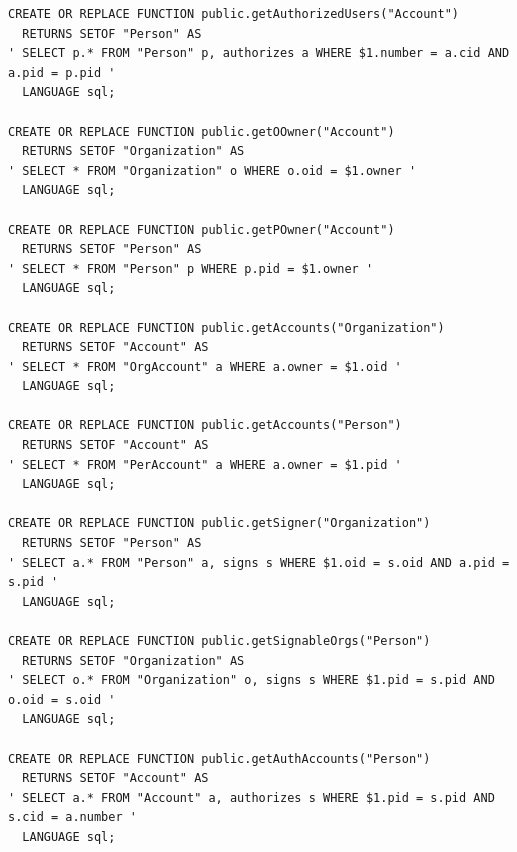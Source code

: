 \documentclass[11pt]{article}
\begin{document}
\begin{verbatim}
CREATE OR REPLACE FUNCTION public.getAuthorizedUsers("Account")
  RETURNS SETOF "Person" AS
' SELECT p.* FROM "Person" p, authorizes a WHERE $1.number = a.cid AND a.pid = p.pid '
  LANGUAGE sql;

CREATE OR REPLACE FUNCTION public.getOOwner("Account")
  RETURNS SETOF "Organization" AS
' SELECT * FROM "Organization" o WHERE o.oid = $1.owner '
  LANGUAGE sql;

CREATE OR REPLACE FUNCTION public.getPOwner("Account")
  RETURNS SETOF "Person" AS
' SELECT * FROM "Person" p WHERE p.pid = $1.owner '
  LANGUAGE sql;

CREATE OR REPLACE FUNCTION public.getAccounts("Organization")
  RETURNS SETOF "Account" AS
' SELECT * FROM "OrgAccount" a WHERE a.owner = $1.oid '
  LANGUAGE sql;

CREATE OR REPLACE FUNCTION public.getAccounts("Person")
  RETURNS SETOF "Account" AS
' SELECT * FROM "PerAccount" a WHERE a.owner = $1.pid '
  LANGUAGE sql;

CREATE OR REPLACE FUNCTION public.getSigner("Organization")
  RETURNS SETOF "Person" AS
' SELECT a.* FROM "Person" a, signs s WHERE $1.oid = s.oid AND a.pid = s.pid '
  LANGUAGE sql;

CREATE OR REPLACE FUNCTION public.getSignableOrgs("Person")
  RETURNS SETOF "Organization" AS
' SELECT o.* FROM "Organization" o, signs s WHERE $1.pid = s.pid AND o.oid = s.oid '
  LANGUAGE sql;

CREATE OR REPLACE FUNCTION public.getAuthAccounts("Person")
  RETURNS SETOF "Account" AS
' SELECT a.* FROM "Account" a, authorizes s WHERE $1.pid = s.pid AND s.cid = a.number '
  LANGUAGE sql;
\end{verbatim}
\end{document}

